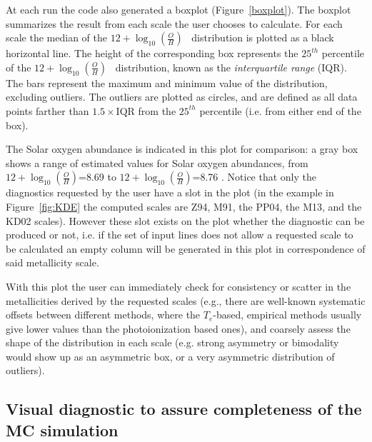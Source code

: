 \documentclass{emulateapj}
\newcommand{\oxab}{\ensuremath{12 + \log_{10}(\frac{O}{H})}}
\begin{document}
At each run the code also generated a boxplot (Figure~\ref{boxplot}). The boxplot summarizes the result from each scale the user chooses to calculate. For each scale the median of the \oxab~ distribution is plotted as a black horizontal line. The height of the corresponding box represents the $25^{th}$ percentile of the \oxab~ distribution, known as the \emph{interquartile range} (IQR). 
The bars represent the maximum and minimum value of the distribution, excluding outliers. The outliers are plotted as circles, and are defined as all data points farther than $1.5\times\mathrm{IQR}$ from the $25^{th}$ percentile (i.e. from either end of the box). 

The Solar oxygen abundance is indicated in this plot for comparison: a gray box shows a range of estimated values for Solar oxygen abundances, from \oxab=8.69 \citep{asplund09_rev} to \oxab=8.76 \citep{chaffau11}.
Notice that only the diagnostics requested by the user have a slot in the plot (in the example in Figure~\ref{fig:KDE} the computed scales are Z94, M91, the PP04, the M13, and the KD02 scales). However these slot exists on the plot whether the diagnostic can be produced or not, i.e. if the set of input lines does not allow a requested scale to be calculated an empty column will be generated in this plot in correspondence of said metallicity scale. 

With this plot the user can immediately check for consistency or scatter in the metallicities derived by the requested scales (e.g., there are well-known systematic offsets between different methods, where the $T_e$-based, empirical methods usually give lower values than the photoionization based ones), and coarsely assess the shape of the distribution in each scale (e.g. strong asymmetry or bimodality would show up as an asymmetric box, or a very asymmetric distribution of outliers).



\subsection{Visual diagnostic to assure completeness of the MC simulation}\label{sec:completeness}
\end{document}
